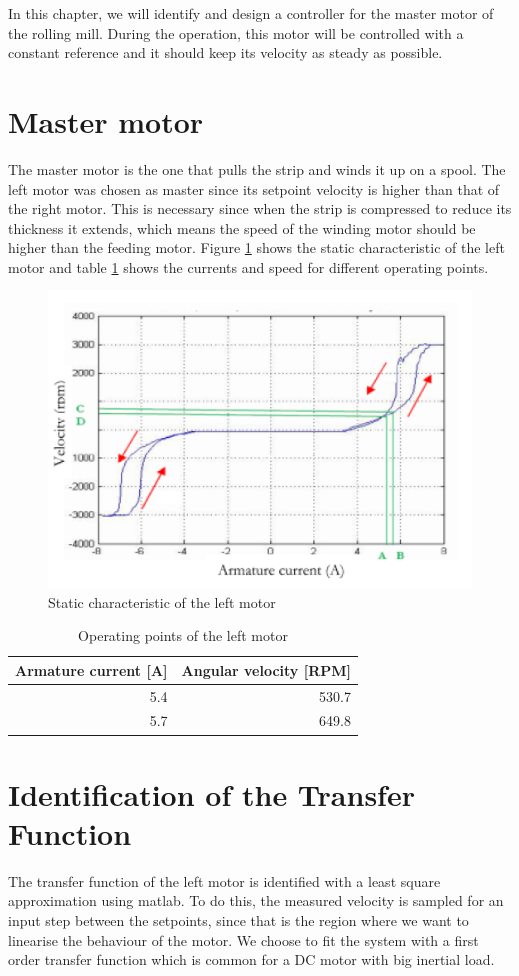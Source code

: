 In this chapter, we will identify and design a controller for the master motor of the rolling mill. During the operation, this motor will be controlled with a constant reference and it should keep its velocity as steady as possible.

\section{Master motor}
The master motor is the one that pulls the strip and winds it up on a spool. The left motor was chosen as master since its setpoint velocity is higher than that of the right motor. This is necessary since when the strip is compressed to reduce its thickness it extends, which means the speed of the winding motor should be higher than the feeding motor. Figure \ref{fig:LM_RPM_curr} shows the static characteristic of the left motor and table \ref{tab:LM_operating_region} shows the currents and speed for different operating points.

\begin{figure}[htbp]
\centering
\includegraphics[width = .6\textwidth]{pics/LM_RPM_Current.png}
\caption{Static characteristic of the left motor\label{fig:LM_RPM_curr}}
\end{figure}

\begin{table}[htbp]
	\centering
	\begin{tabular}{rr}
    \toprule
		Armature current [A] & Angular velocity [RPM] \\ \midrule
    5.4 & 530.7 \\
    5.7 & 649.8 \\\bottomrule
	\end{tabular}
	\caption{Operating points of the left motor\label{tab:LM_operating_region}}
\end{table}

\section{Identification of the Transfer Function}
The transfer function of the left motor is identified with a least square approximation using matlab. To do this, the measured velocity is sampled for an input step between the setpoints, since that is the region where we want to linearise the behaviour of the motor. We choose to fit the system with a first order transfer function which is common for a DC motor with big inertial load.

